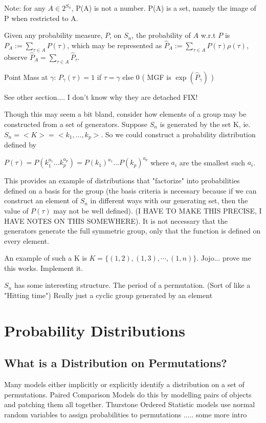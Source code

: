 \documentclass{article}
\theoremstyle{definition}
\begin{document}
Note: for any $A \in 2^{S_n} $, P(A) is not a number. P(A) is a set, namely the image of P when restricted to A. 

Given any probability measure, $P$, on $S_n$, the probability of $A$ w.r.t $P$ is $ P_A  := \sum_{\tau \in A} P(\tau) $, which may be represented as $\hat{P}_A := \sum_{\tau \in A} P(\tau) \rho(\tau) $, observe $\hat{P}_A = \sum_{\tau \in A} \hat{P}_\tau $. 

Point Mass at $\gamma$: $ P_\gamma(\tau) = 1 $ if $\tau = \gamma$ else 0
( MGF is $\exp(\hat{P}_\gamma)$ )

See other section.... I don't know why they are detached FIX!

Though this may seem a bit bland, consider how elements of a group may be constructed from a set of generators. Suppose $S_n$ is generated by the set K, ie. $S_n = < K > = <k_1, \dots, k_p >$. So we could construct a probability distribution defined by

\( P(\tau) = P( k_1^{a_1} \dots k_p^{a_p}) = P( k_1)^{a_1}\dots P(k_p )^{a_p} \) where $a_i$ are the smallest such $a_i$.

This provides an example of distributions that "factorize" into probabilities defined on a basis for the group (the basis criteria is necessary because if we can construct an element of $S_n$ in different ways with our generating set, then the value of $P(\tau)$ may not be well defined). (I HAVE TO MAKE THIS PRECISE, I HAVE NOTES ON THIS SOMEWHERE). It is not necessary that the generators generate the full symmetric group, only that the function is defined on every element.

An example of such a K is $K= \{(1,2), (1,3), \cdots, (1,n) \}$. Jojo... prove me this works. Implement it.

$S_n$ has some interesting structure.
The period of a permutation. (Sort of like a "Hitting time")
Really just a cyclic group generated by an element

\section{Probability Distributions}
\subsection{What is a Distribution on Permutations?}
Many models either implicitly or explicitly identify a distribution on a set of permutations. Paired Comparison Models do this by modelling pairs of objects and patching them all together. Thurstone Ordered Statistic models use normal random variables to assign probabilities to permutations ..... some more intro
\end{document}
